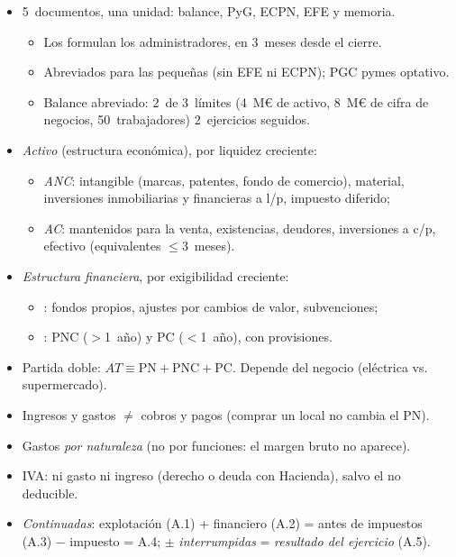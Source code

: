\documentclass{article}
\begin{document}
\begin{columnas}
\begin{itemize}
\item 5~documentos, una unidad: balance, PyG, ECPN, EFE y memoria.
  \begin{itemize}
  \item Los formulan los administradores, en 3~meses desde el cierre.
  \item Abreviados para las pequeñas (sin EFE ni ECPN); PGC pymes optativo.
  \item Balance abreviado: 2~de 3~límites (4~M€ de activo, 8~M€ de cifra de negocios, 50~trabajadores) 2~ejercicios seguidos.
  \end{itemize}
\end{itemize}
\begin{itemize}
\item \emph{Activo} (estructura económica), por liquidez creciente:
  \begin{itemize}
  \item \emph{ANC}: intangible (marcas, patentes, fondo de comercio), material, inversiones inmobiliarias y financieras a l/p, impuesto diferido;
  \item \emph{AC}: mantenidos para la venta, existencias, deudores, inversiones a c/p, efectivo (equivalentes $\leq$3~meses).
  \end{itemize}
\item \emph{Estructura financiera}, por exigibilidad creciente:
  \begin{itemize}
  \item {}: fondos propios, ajustes por cambios de valor, subvenciones;
  \item {}: PNC ($>$1~año) y PC ($<$1~año), con provisiones.
  \end{itemize}
\item Partida doble: $AT\equiv\mathrm{PN}+\mathrm{PNC}+\mathrm{PC}$. Depende del negocio (eléctrica vs. supermercado).
\end{itemize}
\begin{itemize}
\item Ingresos y gastos $\neq$ cobros y pagos (comprar un local no cambia el PN).
\item Gastos \emph{por naturaleza} (no por funciones: el margen bruto no aparece).
\item IVA: ni gasto ni ingreso (derecho o deuda con Hacienda), salvo el no deducible.
\item \emph{Continuadas}: explotación (A.1) + financiero (A.2) = antes de impuestos (A.3) $-$ impuesto = A.4; $\pm$ \emph{interrumpidas} = \emph{resultado del ejercicio} (A.5).

\end{itemize}
\end{columnas}
\end{document}
